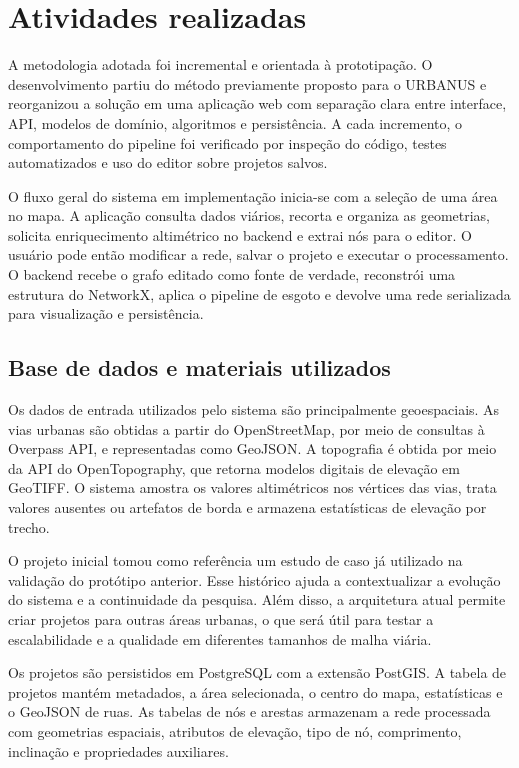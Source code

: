 \documentclass[12pt,a4paper]{article}
\begin{document}
\section{Atividades realizadas}

A metodologia adotada foi incremental e orientada à prototipação.
O desenvolvimento partiu do método previamente proposto para o URBANUS e reorganizou a solução em uma aplicação web com separação clara entre interface, API, modelos de domínio, algoritmos e persistência.
A cada incremento, o comportamento do pipeline foi verificado por inspeção do código, testes automatizados e uso do editor sobre projetos salvos.

O fluxo geral do sistema em implementação inicia-se com a seleção de uma área no mapa.
A aplicação consulta dados viários, recorta e organiza as geometrias, solicita enriquecimento altimétrico no backend e extrai nós para o editor.
O usuário pode então modificar a rede, salvar o projeto e executar o processamento.
O backend recebe o grafo editado como fonte de verdade, reconstrói uma estrutura do NetworkX, aplica o pipeline de esgoto e devolve uma rede serializada para visualização e persistência.

\subsection{Base de dados e materiais utilizados}

Os dados de entrada utilizados pelo sistema são principalmente geoespaciais. As vias urbanas são obtidas a partir do OpenStreetMap, por meio de consultas à Overpass API, e representadas como GeoJSON. A topografia é obtida por meio da API do OpenTopography, que retorna modelos digitais de elevação em GeoTIFF.
O sistema amostra os valores altimétricos nos vértices das vias, trata valores ausentes ou artefatos de borda e armazena estatísticas de elevação por trecho.

O projeto inicial tomou como referência um estudo de caso já utilizado na validação do protótipo anterior.
Esse histórico ajuda a contextualizar a evolução do sistema e a continuidade da pesquisa.
Além disso, a arquitetura atual permite criar projetos para outras áreas urbanas, o que será útil para testar a escalabilidade e a qualidade em diferentes tamanhos de malha viária.

Os projetos são persistidos em PostgreSQL com a extensão PostGIS.
A tabela de projetos mantém metadados, a área selecionada, o centro do mapa, estatísticas e o GeoJSON de ruas.
As tabelas de nós e arestas armazenam a rede processada com geometrias espaciais, atributos de elevação, tipo de nó, comprimento, inclinação e propriedades auxiliares.
\end{document}
